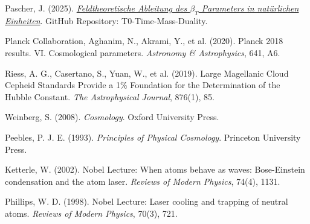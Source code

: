 \documentclass[12pt,a4paper]{article}
\begin{document}
	\begin{thebibliography}{99}
		Pascher, J. (2025). \href{https://github.com/jpascher/T0-Time-Mass-Duality/blob/main/2/pdf/DerivationVonBetaEn.pdf}{\textit{Feldtheoretische Ableitung des $\beta_T$ Parameters in nat\"urlichen Einheiten}}. GitHub Repository: T0-Time-Mass-Duality.
		
		Planck Collaboration, Aghanim, N., Akrami, Y., et al. (2020). Planck 2018 results. VI. Cosmological parameters. \textit{Astronomy \& Astrophysics}, 641, A6.
		
		Riess, A. G., Casertano, S., Yuan, W., et al. (2019). Large Magellanic Cloud Cepheid Standards Provide a 1\% Foundation for the Determination of the Hubble Constant. \textit{The Astrophysical Journal}, 876(1), 85.
		
		Weinberg, S. (2008). \textit{Cosmology}. Oxford University Press.
		
		Peebles, P. J. E. (1993). \textit{Principles of Physical Cosmology}. Princeton University Press.
		
		Ketterle, W. (2002). Nobel Lecture: When atoms behave as waves: Bose-Einstein condensation and the atom laser. \textit{Reviews of Modern Physics}, 74(4), 1131.
		
		Phillips, W. D. (1998). Nobel Lecture: Laser cooling and trapping of neutral atoms. \textit{Reviews of Modern Physics}, 70(3), 721.
	\end{thebibliography}
	
\end{document}
